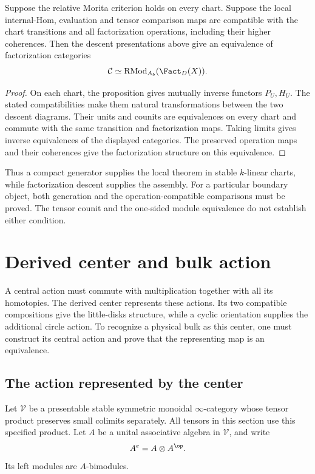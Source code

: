 \begin{theorem}\label{cbc:modules:factorization-morita}
Suppose the relative Morita criterion holds on every chart.
Suppose the local internal-Hom, evaluation and tensor comparison maps are compatible with the chart transitions and all factorization operations, including their higher coherences.
Then the descent presentations above give an equivalence of factorization categories
\[
 \mathcal C\simeq\operatorname{RMod}_{A_b}(\Fact_D(X)).
\]
\end{theorem}
\begin{proof}
On each chart, the proposition gives mutually inverse functors $P_U,H_U$.
The stated compatibilities make them natural transformations between the two descent diagrams.
Their units and counits are equivalences on every chart and commute with the same transition and factorization maps.
Taking limits gives inverse equivalences of the displayed categories.
The preserved operation maps and their coherences give the factorization structure on this equivalence.
\end{proof}

Thus a compact generator supplies the local theorem in stable $k$-linear charts, while factorization descent supplies the assembly.
For a particular boundary object, both generation and the operation-compatible comparisons must be proved.
The tensor counit and the one-sided module equivalence do not establish either condition.

\chapter{Derived center and bulk action}
A central action must commute with multiplication together with all its homotopies.
The derived center represents these actions.
Its two compatible compositions give the little-disks structure, while a cyclic orientation supplies the additional circle action.
To recognize a physical bulk as this center, one must construct its central action and prove that the representing map is an equivalence.

\section{The action represented by the center}

Let $\mathcal V$ be a presentable stable symmetric monoidal $\infty$-category whose tensor product preserves small colimits separately.
All tensors in this section use this specified product.
Let $A$ be a unital associative algebra in $\mathcal V$, and write
\[
 A^e=A\otimes A^{\op}.
\]
Its left modules are $A$-bimodules.

